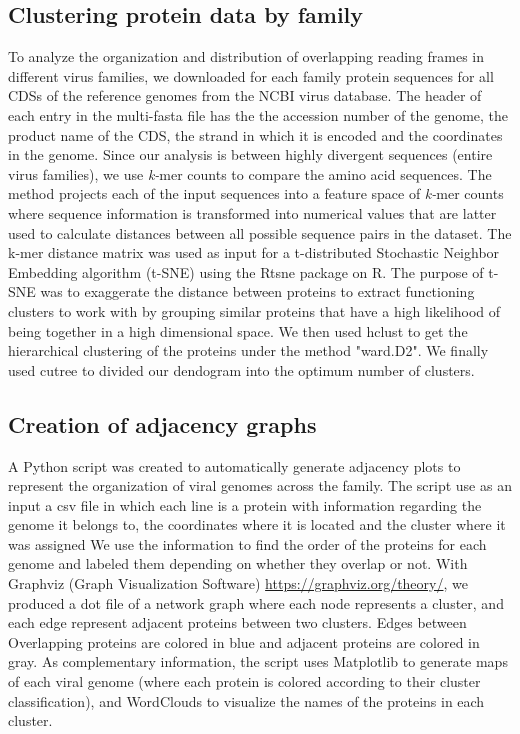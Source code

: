 \documentclass[12pt]{article}
\begin{document}
\subsection{Clustering protein data by family}
To analyze the organization and distribution of overlapping reading frames in different virus families, we downloaded for each family protein sequences for all CDSs of the reference genomes from the NCBI virus database.
The header of each entry in the multi-fasta file has the the accession number of the genome, the product name of the CDS, the strand in which it is encoded and the coordinates in the genome.
Since our analysis is between highly divergent sequences (entire virus families), we use \textit{k-}mer counts to compare the amino acid sequences. 
The method projects each of the input sequences into a feature space of \textit{k-}mer counts where sequence information is transformed into numerical values that are latter used to calculate distances between all possible sequence pairs in the dataset\cite{zielezinski2019benchmarking}. 
The k-mer distance  matrix was used as input for a t-distributed Stochastic Neighbor Embedding algorithm (t-SNE) using the Rtsne package on R. 
The purpose of t-SNE was to exaggerate the distance between proteins to  extract functioning clusters to work with by grouping similar proteins that have a high likelihood of being together in a high dimensional space.
We then used hclust to get the hierarchical clustering of the proteins under the method "ward.D2".
We finally used cutree to divided our dendogram into the optimum number of clusters.

\subsection{Creation of adjacency graphs}
A Python script was created to automatically generate adjacency plots to represent the organization of viral genomes across the family. 
The script use as an input a csv file in which each line is a protein with information regarding the genome it belongs to, the coordinates where it is located and the cluster where it was assigned
We use the information to find the order of the proteins for each genome and labeled them depending on whether they overlap or not. 
With Graphviz (Graph Visualization Software) \url{https://graphviz.org/theory/}, we produced a dot file of a network graph where each node represents a cluster, and each edge represent adjacent proteins between two clusters.
Edges between Overlapping proteins are colored in blue and adjacent proteins are colored in gray. 
As complementary information, the script uses Matplotlib\cite{Hunter:2007} to generate maps of each viral genome (where each protein is colored according to their cluster classification), and WordClouds to visualize the names of the proteins in each cluster.
\end{document}
